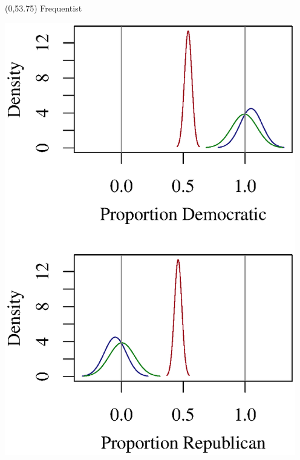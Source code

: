 \documentclass{article}
\begin{document}
\begin{textblock}{6}(0,53.75)
\center \qquad Frequentist
\begin{center}
\includegraphics[width=5in]{ei.regress.eps}
\end{center}
\end{textblock}
\end{document}
